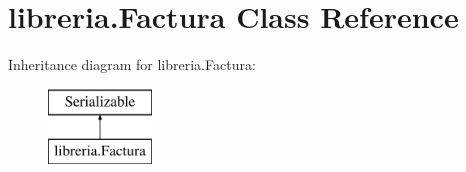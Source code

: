 \hypertarget{classlibreria_1_1_factura}{}\section{libreria.\+Factura Class Reference}
\label{classlibreria_1_1_factura}
Inheritance diagram for libreria.\+Factura\+:\begin{figure}[H]
\begin{center}
\leavevmode
\includegraphics[height=2.000000cm]{classlibreria_1_1_factura}
\end{center}
\end{figure}
